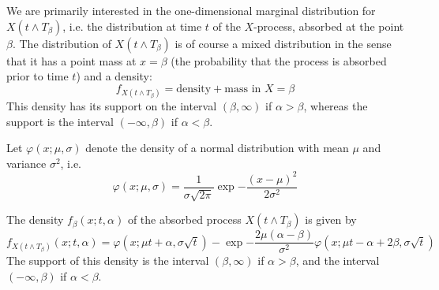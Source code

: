 We are primarily interested in the one-dimensional marginal distribution for $X(t\wedge T_{\beta})$, i.e. the distribution at time $t$ of the $X$-process, absorbed at the point $\beta$. The distribution of $X(t\wedge T_{\beta})$ is of course a mixed distribution in the sense that it has a point mass at $x = \beta$ (the probability that the process is absorbed prior to time $t$) and a density:
\begin{equation}
    f_{X(t\wedge T_{\beta})} = \text{density} + \text{mass in }X= \beta
\end{equation}
This density has its support on the interval $(\beta,\infty)$ if $\alpha > \beta$, whereas the support is the interval $(-\infty,\beta)$ if $\alpha < \beta$.
\begin{definition}
    Let $\varphi(x;\mu, \sigma)$ denote the density of a normal distribution with mean $\mu$ and variance $\sigma^2$, i.e.
    \begin{equation}
        \varphi(x;\mu, \sigma) = \frac{1}{\sigma\sqrt{2\pi}}\exp{-\frac{(x-\mu)^2}{2\sigma^2}}
    \end{equation}
\end{definition}
\begin{proposition}\label{f}
    The density $f_{\beta}(x;t,\alpha)$ of the absorbed process $X(t\wedge T_{\beta})$ is given by
    \begin{equation}\label{opopoopopo}
        f_{X(t\wedge T_{\beta})}(x;t,\alpha) = \varphi(x;\mu t+ \alpha, \sigma\sqrt{t})-\exp{-\frac{2\mu(\alpha-\beta)}{\sigma^2}}\varphi(x;\mu t - \alpha + 2\beta, \sigma\sqrt{t})
    \end{equation}
    The support of this density is the interval $(\beta,\infty)$ if $\alpha > \beta$, and the interval $(-\infty,\beta)$ if $\alpha < \beta$.
\end{proposition}

